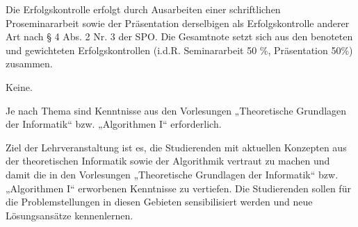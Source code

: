 \begin{course}

\setdoclanguagegerman
{}



\coursehead


\label{cour_13745.dp_997}


\begin{styleenv}
\begin{assessment}
Die Erfolgskontrolle erfolgt durch Ausarbeiten einer schriftlichen Proseminararbeit sowie der Präsentation derselbigen als Erfolgskontrolle anderer Art nach § 4 Abs. 2 Nr. 3 der SPO. Die Gesamtnote setzt sich aus den benoteten und gewichteten Erfolgskontrollen (i.d.R. Seminararbeit 50 \%, Präsentation 50\%) zusammen.


\end{assessment}

\begin{conditions}Keine.\end{conditions}

\begin{recommendations}Je nach Thema sind Kenntnisse aus den Vorlesungen „Theoretische Grundlagen der Informatik“ bzw. „Algorithmen I“ erforderlich.

\end{recommendations}
\end{styleenv}

\begin{learningoutcomes}
Ziel der Lehrveranstaltung ist es, die Studierenden mit aktuellen Konzepten aus der theoretischen Informatik sowie der Algorithmik vertraut zu machen und damit die in den Vorlesungen „Theoretische Grundlagen der Informatik“ bzw. „Algorithmen I“ erworbenen Kenntnisse zu vertiefen. Die Studierenden sollen für die Problemstellungen in diesen Gebieten sensibilisiert werden und neue Lösungsansätze kennenlernen.


\end{learningoutcomes}
\end{course}

